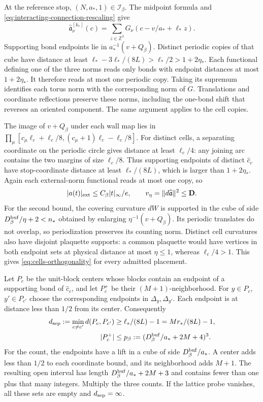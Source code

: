 \documentclass[11pt,letterpaper,reqno]{amsart}
\newcommand{\Z}{\mathbb Z}
\begin{document}
At the reference stop, $(N,a_*,1)\in\mathcal I_\beta$.
The midpoint formula and
\eqref{eq:interacting-connection-rescaling} give
\[
 \widehat{\mathfrak a}^{[k_*]}_\nu(c)
       =\sum_{z\in\Z^3}G_\nu(c-v/a_*+\ell_*z).
\]
Supporting bond endpoints lie in
$a_*^{-1}(v+Q_\beta)$.
Distinct periodic copies of that cube have
distance at least
$\ell_*-3\ell_*/(8L)>\ell_*/2>1+2\eta_*$.
Each functional defining one of the three
norms reads only bonds with endpoint distances
at most $1+2\eta_*$. It therefore reads
at most one periodic copy. Taking its
supremum identifies each torus norm with
the corresponding norm of $G$.
Translations and coordinate reflections
preserve these norms, including the one-bond
shift that reverses an oriented component.
The same argument applies to the cell copies.

The image of $v+Q_\beta$ under each wall map
lies in
$\prod_\mu[c_\mu\ell_c+\ell_c/8,(c_\mu+1)\ell_c-\ell_c/8]$.
For distinct cells, a separating coordinate
on the periodic circle gives distance
at least $\ell_c/4$: any joining arc
contains the two margins of size $\ell_c/8$.
Thus supporting endpoints of distinct
$\widehat c_c$ have stop-coordinate distance
at least $\ell_*/(8L)$, which is larger
than $1+2\eta_*$. Again each external-norm
functional reads at most one copy, so
\begin{equation}\label{eq:interacting-external-probe-bound}
 |a(t)|_{\rm ext}\le C_\beta|t|_\infty/e,\qquad
                 v_\eta=\|d\widehat{\mathfrak a}\|^2\le\mathbf D.
\end{equation}
For the second bound, the covering curvature
$dW$ is supported in the cube of side
$D_\beta^{\rm buf}/\eta+2<n_*$
obtained by enlarging $\eta^{-1}(v+Q_\beta)$.
Its periodic translates do not overlap,
so periodization preserves its counting
norm. Distinct cell curvatures also have
disjoint plaquette supports: a common
plaquette would have vertices in both
endpoint sets at physical distance at
most $\eta\le1$, whereas $\ell_c/4>1$.
This gives \eqref{eq:cells-orthogonality}
for every admitted placement.

Let $P_c$ be the unit-block centers whose
blocks contain an endpoint of a supporting
bond of $\widehat c_c$, and let $P_c^+$
be their $(M+1)$-neighborhood.
For $y\in P_c$, $y'\in P_{c'}$ choose the
corresponding endpoints in $\Delta_y,\Delta_{y'}$.
Each endpoint is at distance less than $1/2$
from its center. Consequently
\begin{align}
 d_{\rm sep}:=\min_{c\ne c'}d(P_c,P_{c'})
    &\ge\ell_*/(8L)-1=Mr_*/(8L)-1,
                              \label{eq:interacting-probe-separation}\\
 |P_c^+|&\le p_\beta:=
                  (D_\beta^{\rm buf}/a_*+2M+4)^3 .
                              \label{eq:interacting-support-number}
\end{align}
For the count, the endpoints have a lift in
a cube of side $D_\beta^{\rm buf}/a_*$.
A center adds less than $1/2$ to each
coordinate bound, and its neighborhood adds
$M+1$. The resulting open interval has
length $D_\beta^{\rm buf}/a_*+2M+3$
and contains fewer than one plus that
many integers. Multiply the three counts.
If the lattice probe vanishes, all these
sets are empty and $d_{\rm sep}=\infty$.
\end{document}
